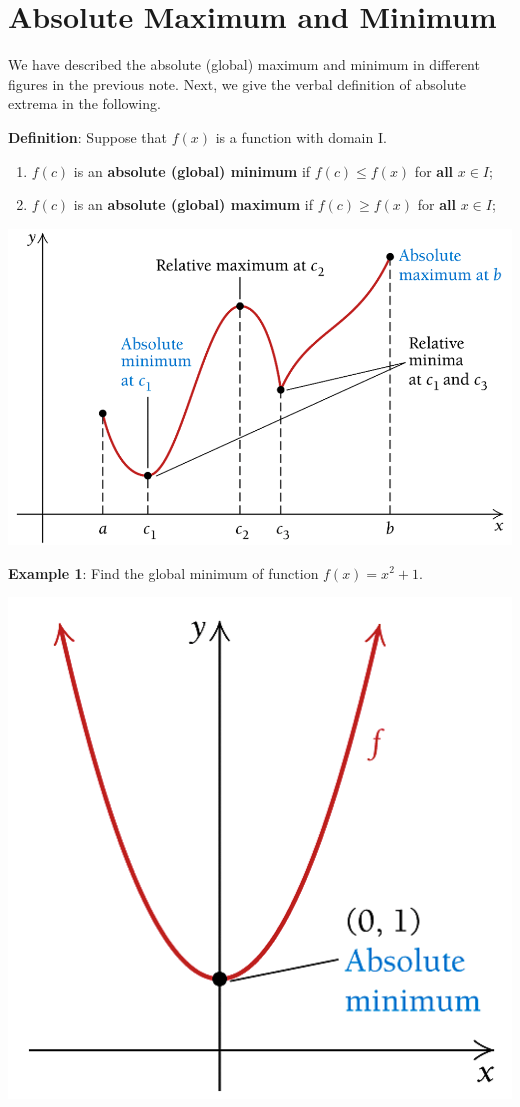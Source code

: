 \documentclass[
]{book}
\begin{document}
\hfill\break

\hypertarget{absolute-maximum-and-minimum}{%
\section{Absolute Maximum and Minimum}\label{absolute-maximum-and-minimum}}

We have described the absolute (global) maximum and minimum in different figures in the previous note. Next, we give the verbal definition of absolute extrema in the following.

\textbf{Definition}: Suppose that \(f(x)\) is a function with domain I.

\begin{enumerate}
\def\labelenumi{\arabic{enumi}.}
\item
  \(f(c)\) is an \textbf{absolute (global) minimum} if \(f(c) \le f(x)\) for \textbf{all} \(x \in I\);
\item
  \(f(c)\) is an \textbf{absolute (global) maximum} if \(f(c) \ge f(x)\) for \textbf{all} \(x \in I\);
\end{enumerate}

\begin{center}\includegraphics[width=0.6\linewidth]{img09/w09-GlobalExtrema} \end{center}

\textbf{Example 1}: Find the global minimum of function \(f(x) = x^2 +1\).

\begin{center}\includegraphics[width=0.3\linewidth]{img09/w09-example01} \end{center}
\end{document}
